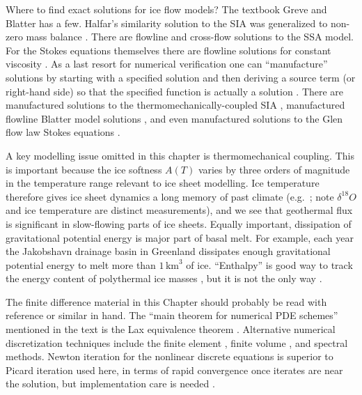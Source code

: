 \documentclass[letterpaper,final,12pt,reqno]{amsart}
\begin{document}
Where to find exact solutions for ice flow models?  The textbook Greve and Blatter \cite{GreveBlatter2009} has a few.  Halfar's similarity solution to the SIA \cite{Halfar81,Halfar83} was generalized to non-zero mass balance \cite{BLKCB}.  There are flowline \cite{vanderVeen83} and cross-flow \cite{SchoofStream} solutions to the SSA model.  For the Stokes equations themselves there are flowline solutions for constant viscosity \cite{BaliseRaymond1985}.  As a last resort for numerical verification one can ``manufacture'' solutions by starting with a specified solution and then deriving a source term (or right-hand side) so that the specified function is actually a solution \cite{Roache}.  There are manufactured solutions to the thermomechanically-coupled SIA \cite{BBL}, manufactured flowline Blatter model solutions \cite{GlowinskiRappaz}, and even manufactured solutions to the Glen flow law Stokes equations \cite{JouvetRappaz2011,SargentFastook2010}.

A key modelling issue omitted in this chapter is thermomechanical coupling.  This is important because the ice softness $A(T)$ varies by three orders of magnitude in the temperature range relevant to ice sheet modelling.  Ice temperature therefore gives ice sheet dynamics a long memory of past climate (e.g.~\cite{JohnsenetalGRIP}; note $\delta^{18}O$ and ice temperature are distinct measurements), and we see that geothermal flux is significant in slow-flowing parts of ice sheets.  Equally important, dissipation of gravitational potential energy is major part of basal melt.  For example, each year the Jakobshavn drainage basin in Greenland dissipates enough gravitational potential energy to melt more than $1\,\text{km}^3$ of ice.  ``Enthalpy'' is good way to track the energy content of polythermal ice masses \cite{AschwandenBuelerKhroulevBlatter}, but it is not the only way \cite{Greve}.

The finite difference material in this Chapter should probably be read with reference \cite{MortonMayers} or similar in hand.  The ``main theorem for numerical PDE schemes'' mentioned in the text is the Lax equivalence theorem \cite{MortonMayers}.  Alternative numerical discretization techniques include the finite element \cite{Braess}, finite volume \cite{LeVeque}, and spectral \cite{Trefethen} methods.  Newton iteration for the nonlinear discrete equations is superior to Picard iteration used here, in terms of rapid convergence once iterates are near the solution, but implementation care is needed \cite{Kelley}.
\end{document}
